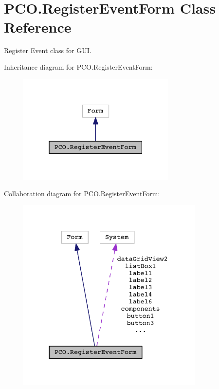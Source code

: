 \hypertarget{classPCO_1_1RegisterEventForm}{}\section{P\+C\+O.\+Register\+Event\+Form Class Reference}
\label{classPCO_1_1RegisterEventForm}


Register Event class for G\+UI.  




Inheritance diagram for P\+C\+O.\+Register\+Event\+Form\+:\nopagebreak
\begin{figure}[H]
\begin{center}
\leavevmode
\includegraphics[width=223pt]{classPCO_1_1RegisterEventForm__inherit__graph}
\end{center}
\end{figure}


Collaboration diagram for P\+C\+O.\+Register\+Event\+Form\+:\nopagebreak
\begin{figure}[H]
\begin{center}
\leavevmode
\includegraphics[width=264pt]{classPCO_1_1RegisterEventForm__coll__graph}
\end{center}
\end{figure}
